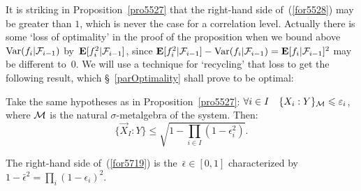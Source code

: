 \label{lbl91}It is striking in Proposition~\ref{pro5527}
that the right-hand side of~(\ref{for5528})
may be greater than $1$, which is never the case for a correlation level.
Actually there is some `loss of optimality' in the proof
of the proposition when we bound above $\operatorname{Var}(f_i|\mathcal{F}_{i-1})$
by~$\mathop{\smash{\mathbf{E}}}\nolimits[f_i^2|\mathcal{F}_{i-1}]$, since $\mathop{\smash{\mathbf{E}}}\nolimits[f_i^2|\mathcal{F}_{i-1}] - \operatorname{Var}(f_i|\mathcal{F}_{i-1}) = \mathop{\smash{\mathbf{E}}}\nolimits[f_i|\mathcal{F}_{i-1}]^2$
may be different to~$0$. We will use a technique for `recycling' that loss
to get the following result, which \S~\ref{parOptimality} shall prove to be optimal:
%
\begin{Thm}\label{thm5750}
Take the same hypotheses as in Proposition~\ref{pro5527}:
$\forall i\in I \quad \{X_i:Y\}_{\mcal{M}} \leq \epsilon_i$, where $\mathcal{M}$
is the natural $\sigma$-metalgebra of the system. Then:
\[\label{for5719} \big\{\vec{X}_I:Y\big\} \leq \sqrt{1-\prod_{i\in I}(1-\epsilon_i^2)} .\]
\end{Thm}

\begin{Rmk}
The right-hand side of~(\ref{for5719})
is the~$\bar\epsilon\in[0,1]$ characterized by
$1-\bar\epsilon^2 = \prod_i (1-\epsilon_i)^2$.
\end{Rmk}

